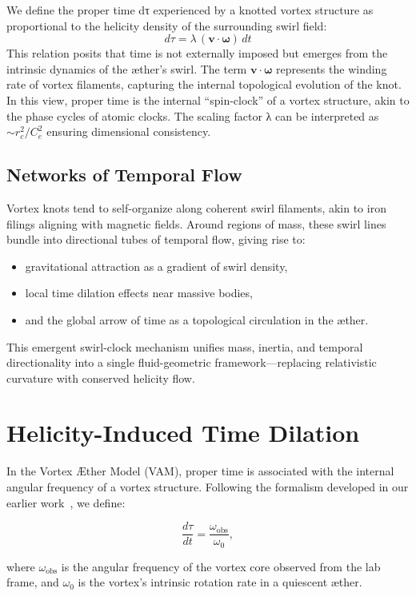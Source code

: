 We define the proper time dτ experienced by a knotted vortex structure as proportional to the helicity density of the surrounding swirl field:
$$ d\tau = \lambda \, (\mathbf{v} \cdot \boldsymbol{\omega}) \, dt $$
This relation posits that time is not externally imposed but emerges from the intrinsic dynamics of the æther’s swirl. The term $\mathbf{v} \cdot \boldsymbol{\omega}$ represents the winding rate of vortex filaments, capturing the internal topological evolution of the knot. In this view, proper time is the internal “spin-clock” of a vortex structure, akin to the phase cycles of atomic clocks. The scaling factor λ can be interpreted as $\sim r_c^2 / C_e^2$ ensuring dimensional consistency.

\subsection*{Networks of Temporal Flow}

Vortex knots tend to self-organize along coherent swirl filaments, akin to iron filings aligning with magnetic fields. Around regions of mass, these swirl lines bundle into directional tubes of temporal flow, giving rise to:
\begin{itemize}
    \item gravitational attraction as a gradient of swirl density,
    \item local time dilation effects near massive bodies,
    \item and the global arrow of time as a topological circulation in the æther.
\end{itemize}

This emergent swirl-clock mechanism unifies mass, inertia, and temporal directionality into a single fluid-geometric framework—replacing relativistic curvature with conserved helicity flow.

\section{Helicity-Induced Time Dilation}

In the Vortex Æther Model (VAM), proper time is associated with the internal angular frequency of a vortex structure. Following the formalism developed in our earlier work~\cite{iskandarani2025timedilation}, we define:

\[
\frac{d\tau}{dt} = \frac{\omega_{\text{obs}}}{\omega_0},
\]

where $\omega_{\text{obs}}$ is the angular frequency of the vortex core observed from the lab frame, and $\omega_0$ is the vortex's intrinsic rotation rate in a quiescent æther.

